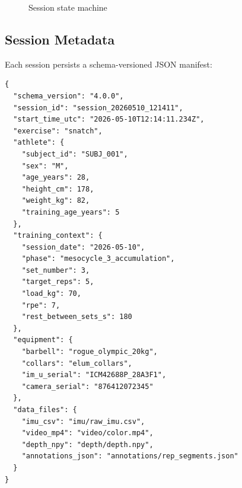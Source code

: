 \begin{figure}[h]
    \centering
    \caption{Session state machine}
    \label{fig:session_state}
\end{figure}

\subsection{Session Metadata}

Each session persists a schema-versioned JSON manifest:

\begin{lstlisting}[caption={Session metadata JSON schema}]
{
  "schema_version": "4.0.0",
  "session_id": "session_20260510_121411",
  "start_time_utc": "2026-05-10T12:14:11.234Z",
  "exercise": "snatch",
  "athlete": {
    "subject_id": "SUBJ_001",
    "sex": "M",
    "age_years": 28,
    "height_cm": 178,
    "weight_kg": 82,
    "training_age_years": 5
  },
  "training_context": {
    "session_date": "2026-05-10",
    "phase": "mesocycle_3_accumulation",
    "set_number": 3,
    "target_reps": 5,
    "load_kg": 70,
    "rpe": 7,
    "rest_between_sets_s": 180
  },
  "equipment": {
    "barbell": "rogue_olympic_20kg",
    "collars": "elum_collars",
    "im_u_serial": "ICM42688P_28A3F1",
    "camera_serial": "876412072345"
  },
  "data_files": {
    "imu_csv": "imu/raw_imu.csv",
    "video_mp4": "video/color.mp4",
    "depth_npy": "depth/depth.npy",
    "annotations_json": "annotations/rep_segments.json"
  }
}
\end{lstlisting}

